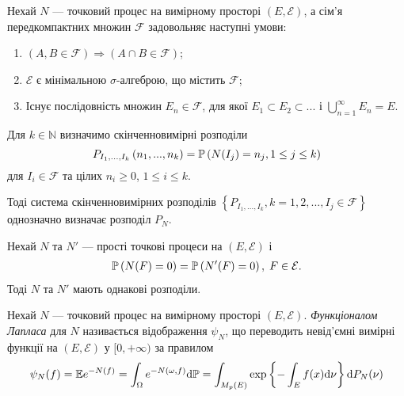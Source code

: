 \begin{theorem}\label{th:point_proc_uniqueness}
    Нехай $N$ --- точковий процес на вимірному просторі
    $\left(E, \mathcal{E}\right)$, а сім'я передкомпактних множин $\mathcal{F}$
    задовольняє наступні умови:
    \begin{enumerate}
        \item $\left(A, B \in \mathcal{F}\right) \Rightarrow \left(A \cap B \in \mathcal{F}\right)$;
        \item $\mathcal{E}$ є мінімальною $\sigma$-алгеброю, що містить $\mathcal{F}$;
        \item Існує послідовність множин $E_n \in \mathcal{F}$, для якої
        $E_1 \subset E_2 \subset ...$ і $\bigcup_{n=1}^{\infty} E_n = E$.
    \end{enumerate}
    Для $k \in \mathbb{N}$ визначимо скінченновимірні розподіли
    $$
        P_{I_1,...,I_k} \left(n_1, ..., n_k\right) = 
        \P{N(I_j) = n_j, 1\leq j \leq k}
    $$
    для $I_i \in \mathcal{F}$ та цілих $n_i \geq 0$, $1 \leq i \leq k$.
    
    Тоді система скінченновимірних розподілів
    $\left\{P_{I_1,...,I_k}, k = 1,2,..., I_j \in \mathcal{F} \right\}$
    однозначно визначає розподіл $P_N$.
\end{theorem}

\begin{theorem}\label{th:point_proc_uniqueness_simple}
    Нехай $N$ та $N'$ --- прості точкові процеси на $\left(E, \mathcal{E}\right)$ і
    \begin{gather*}
        \P{N(F) = 0} = \P{N'(F) = 0}, \; F \in \mathcal{E}.
    \end{gather*}
    Тоді $N$ та $N'$ мають однакові розподіли.
\end{theorem}

\begin{definition}
    Нехай $N$ --- точковий процес на вимірному просторі
    $\left(E, \mathcal{E}\right)$. \emph{Функціоналом Лапласа} для $N$
    називається відображення $\psi_N$, що переводить невід'ємні
    вимірні функції на $\left(E, \mathcal{E}\right)$ у $[0, +\infty)$
    за правилом
    \begin{gather}
        \psi_N(f) = \E e^{-N(f)} = \int_{\Omega} e^{-N(\omega, f)} \d \mathbb{P} = 
        \int_{M_p(E)} \exp\left\{ -\int_E f(x) \d \nu\right\} \d P_N (\nu)
    \end{gather}
\end{definition}


